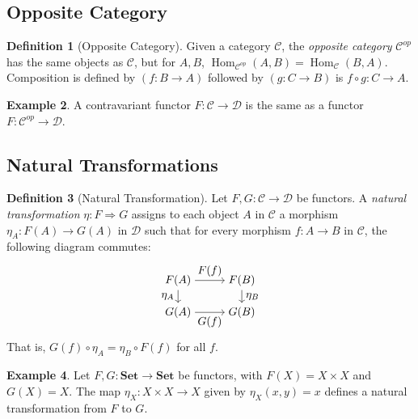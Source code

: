 \documentclass[11pt]{article}
\theoremstyle{definition}
\newtheorem{definition}{Definition}[section]
\newtheorem{example}[definition]{Example}
\theoremstyle{plain}
\begin{document}
\subsection{Opposite Category}

\begin{definition}[Opposite Category]
    Given a category $\mathcal{C}$, the \emph{opposite category} $\mathcal{C}^{op}$ has the same objects as $\mathcal{C}$, but for $A, B$, $\operatorname{Hom}_{\mathcal{C}^{op}}(A, B) = \operatorname{Hom}_{\mathcal{C}}(B, A)$. Composition is defined by $(f : B \to A)$ followed by $(g : C \to B)$ is $f \circ g : C \to A$.
\end{definition}

\begin{example}
    A contravariant functor $F : \mathcal{C} \to \mathcal{D}$ is the same as a functor $F : \mathcal{C}^{op} \to \mathcal{D}$.
\end{example}

\subsection{Natural Transformations}

\begin{definition}[Natural Transformation]
    Let $F, G : \mathcal{C} \to \mathcal{D}$ be functors. A \emph{natural transformation} $\eta : F \Rightarrow G$ assigns to each object $A$ in $\mathcal{C}$ a morphism $\eta_A : F(A) \to G(A)$ in $\mathcal{D}$ such that for every morphism $f : A \to B$ in $\mathcal{C}$, the following diagram commutes:
    \[
        \begin{tikzpicture}[baseline=(current bounding box.center)]
            \node (FA) at (0,1) {$F(A)$};
            \node (FB) at (2,1) {$F(B)$};
            \node (GA) at (0,0) {$G(A)$};
            \node (GB) at (2,0) {$G(B)$};
            \draw[->] (FA) -- node[above] {$F(f)$} (FB);
            \draw[->] (GA) -- node[below] {$G(f)$} (GB);
            \draw[->] (FA) -- node[left] {$\eta_A$} (GA);
            \draw[->] (FB) -- node[right] {$\eta_B$} (GB);
        \end{tikzpicture}
    \]
    That is, $G(f) \circ \eta_A = \eta_B \circ F(f)$ for all $f$.
\end{definition}

\begin{example}
    Let $F, G : \mathbf{Set} \to \mathbf{Set}$ be functors, with $F(X) = X \times X$ and $G(X) = X$. The map $\eta_X : X \times X \to X$ given by $\eta_X(x, y) = x$ defines a natural transformation from $F$ to $G$.
\end{example}
\end{document}
